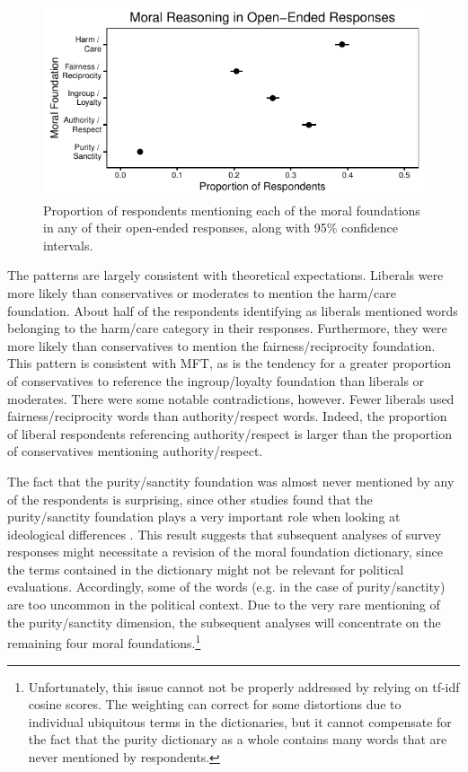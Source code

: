 \documentclass[12pt]{article}
\begin{document}
\begin{figure}[ht]\centering
\includegraphics{../calc/fig/prop_mft.pdf}
\caption{Proportion of respondents mentioning each of the moral foundations in any of their open-ended responses, along with 95\% confidence intervals.}\label{fig:prop_ideol}
\end{figure}

The patterns are largely consistent with theoretical expectations. Liberals were more likely than conservatives or moderates to mention the harm/care foundation. About half of the respondents identifying as liberals mentioned words belonging to the harm/care category in their responses. Furthermore, they were more likely than conservatives to mention the fairness/reciprocity foundation. This pattern is consistent with MFT, as is the tendency for a greater proportion of conservatives to reference the ingroup/loyalty foundation than liberals or moderates. There were some notable contradictions, however. Fewer liberals used fairness/reciprocity words than authority/respect words. Indeed, the proportion of liberal respondents referencing authority/respect is larger than the proportion of conservatives mentioning authority/respect.

The fact that the purity/sanctity foundation was almost never mentioned by any of the respondents is surprising, since other studies found that the purity/sanctity foundation plays a very important role when looking at ideological differences \citep{koleva2012tracing}. This result suggests that subsequent analyses of survey responses might necessitate a revision of the moral foundation dictionary, since the terms contained in the dictionary might not be relevant for political evaluations. Accordingly, some of the words (e.g. in the case of purity/sanctity) are too uncommon in the political context. Due to the very rare mentioning of the purity/sanctity dimension, the subsequent analyses will concentrate on the remaining four moral foundations.\footnote{Unfortunately, this issue cannot not be properly addressed by relying on tf-idf cosine scores. The weighting can correct for some distortions due to individual ubiquitous terms in the dictionaries, but it cannot compensate for the fact that the purity dictionary as a whole contains many words that are never mentioned by respondents.}
\end{document}
